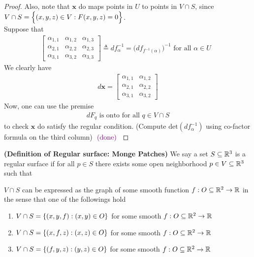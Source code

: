 \documentclass{report}
\begin{document}
\begin{proof}
Also, note that $\textbf{x}$ do maps points in $U$ to points in $V\cap S$, since $V\cap S=\Big\{ (x,y,z)\in V:F(x,y,z)=0 \Big\}$.\\

Suppose that 
\begin{align*}
\begin{bmatrix}
  \alpha_{1,1} & \alpha_{1,2} & \alpha _{1,3}\\
  \alpha _{2,1} & \alpha _{2,2} & \alpha _{2,3}\\
  \alpha _{3,1} & \alpha _{3,2} & \alpha _{3,3}
\end{bmatrix}\triangleq df^{-1}_\alpha  =\big(df_{f^{-1}(\alpha )} \big)^{-1}\text{ for all $\alpha \in U$ }
\end{align*}
We clearly have 
\begin{align*}
d\textbf{x}=\begin{bmatrix}
  \alpha_{1,1} & \alpha _{1,2}\\
  \alpha _{2,1} & \alpha _{2,2}\\
  \alpha_{3,1} & \alpha_{3,2}
\end{bmatrix}
\end{align*}
Now, one can use the premise 
\begin{align*}
dF_q\text{ is onto for all } q\in V\cap S
\end{align*}
to check $\textbf{x}$ do satisfy the regular condition. (Compute $\text{det}(df_{\alpha }^{-1})$ using co-factor formula on the third column) $\textcolor{violet}{\text{ (done) }}$
\end{proof}
\begin{mdframed}

\end{mdframed}
\begin{definition}
\textbf{(Definition of Regular surface: Monge Patches)} We say a set $S\subseteq \mathbb{R}^3$ is a regular surface if for all $p \in S$ there exists some open neighborhood $ p \in V\subseteq \mathbb{R}^3$ such that 
\begin{center}
   \begin{minipage}{0.9\linewidth}  

$V\cap S$   can be expressed as the graph of some smooth function $f:O\subseteq \mathbb{R}^2 \rightarrow \mathbb{R}$ in the sense that one of the followings hold 
   \end{minipage}
\end{center}
\begin{enumerate}[label=(\alph*)]
  \item $V\cap S=\{ (x,y,f):(x,y)\in O \}$ for some smooth $f:O \subseteq \mathbb{R}^2 \rightarrow \mathbb{R}$
  \item $V\cap S=\{ (x,f,z):(x,z)\in O \}$ for some smooth $f:O \subseteq \mathbb{R}^2 \rightarrow \mathbb{R}$
  \item $V\cap S=\{ (f,y,z):(y,z)\in O \}$ for some smooth $f:O \subseteq \mathbb{R}^2 \rightarrow \mathbb{R}$
\end{enumerate}
\end{definition}
\end{document}
